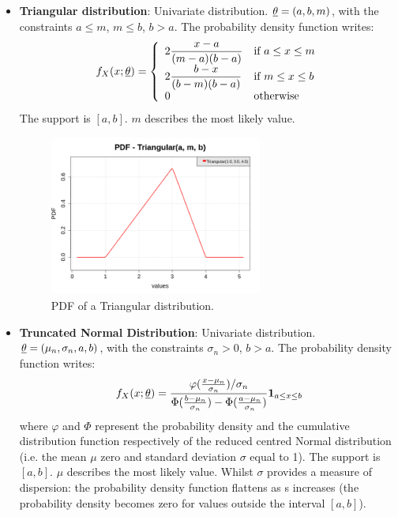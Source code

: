 {\begin{itemize}
\item {\bf Triangular distribution}: Univariate distribution. ${\underline{\theta}} = \left(a,b,m \right)$, with the constraints $a \leq m$, $m \leq b$, $b>a$. The probability density function writes:
\begin{equation}
f_X(x;{\underline{\theta}}) = \left\{
\begin{array}{ll}
\displaystyle 2  \frac{x-a}{(m-a)(b-a)} & \textrm{if}\ a\leq x \leq m \\
\displaystyle 2  \frac{b-x}{(b-m)(b-a)} & \textrm{if}\ m\leq x \leq b \\
0 & \textrm{otherwise}
\end{array}
\right.
\end{equation}
The support is $[a,b]$. $m$ describes the most likely value.

\begin{figure}[H]
\begin{center}
\includegraphics[width=7cm]{Figures/pdf_Triangular.png}
\caption{PDF of a  Triangular distribution.}
\end{center}
\end{figure}



\item {\bf Truncated Normal Distribution}: Univariate distribution. ${\underline{\theta}} = \left(\mu_n,\sigma_n,a,b \right)$, with the constraints $\sigma_n>0$, $b>a$. The probability density function writes:
\begin{equation}
f_X(x;{\underline{\theta}}) = \frac{\varphi(\frac{x-\mu_n}{\sigma_n}) / \sigma_n}{\Phi(\frac{b-\mu_n}{\sigma_n})-\Phi(\frac{a-\mu_n}{\sigma_n})} \mathbf{1}_{a \leq x \leq b}
\end{equation}
where $\varphi$ and $\Phi$ represent the probability density and
the cumulative distribution function respectively of the reduced
centred Normal distribution (i.e. the mean $\mu$ zero and standard
deviation $\sigma$ equal to 1). The support is $[a,b]$. $\mu$ describes the most likely value. Whilst $\sigma$ provides a measure of dispersion: the probability density function flattens as s increases (the probability density becomes zero for values outside the interval $[a,b]$).


\end{itemize}}
